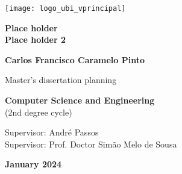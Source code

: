 \begin{titlepage}
\begin{center}

\begin{flushright}
 \texttt{[image: logo\_ubi\_vprincipal]}\\


\vspace{7.6cm}

\rostotitulo \textbf{Place holder} \\
\rostosubtit \textbf{Place holder 2}\\

\vspace{1.8cm}

\rostonomes \textbf{Carlos Francisco Caramelo Pinto}\\

\vspace{1.4cm}


\rostooutros Master's dissertation planning

\rostonomes \textbf{Computer Science and Engineering}\\
\rostooutros (2nd degree cycle)\\

\vspace{3.3cm}

\rostooutros Supervisor: André Passos\\
\rostooutros Supervisor: Prof. Doctor Simão Melo de Sousa\\

\vspace{1.4cm}

\rostooutros \textbf{January 2024}

\end{flushright}

\end{center}
\end{titlepage}
